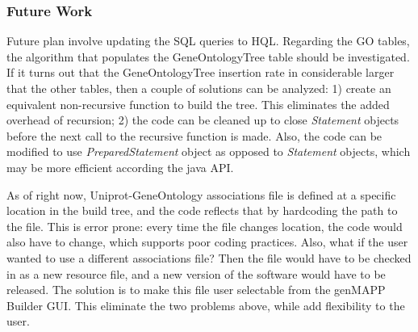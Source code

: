 \subsubsection{Future Work}
Future plan involve updating the SQL queries to HQL.
Regarding the GO tables, the algorithm that populates the GeneOntologyTree table should be investigated.
If it turns out that the GeneOntologyTree insertion rate in considerable larger that the other tables, then
a couple of solutions can be analyzed: 1) create an equivalent non-recursive function to build the tree. This
eliminates the added overhead of recursion; 2) the code can be cleaned up to
close \emph{Statement} objects before the next call to the recursive function is made. Also, the code can
be modified to use \emph{PreparedStatement} object as opposed to \emph{Statement} objects, which may be more
efficient according the java API.


As of right now, Uniprot-GeneOntology associations file is defined at a specific location in the build tree,
and the code reflects that by hardcoding the path to the file. This is error prone: every time the file changes location,
the code would also have to change, which supports poor coding practices. Also, what if the user wanted to use a different
associations file? Then the file would have to be checked in as a new resource file, and a new version of the software would have
to be released. The solution is to make this file user selectable from the genMAPP Builder GUI. This eliminate the two problems
above, while add flexibility to the user.
